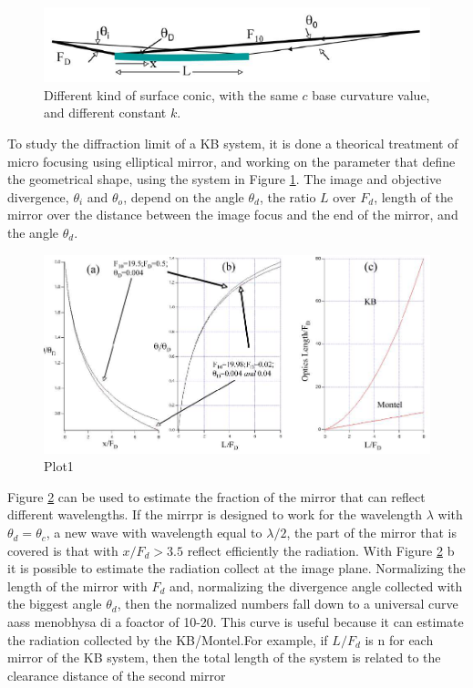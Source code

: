 \begin{figure}[H]
%
\centering
%
\includegraphics[width=.7\textwidth]{Immagini/Chapter2/System4}
%
\caption{Different kind of surface conic, with the same $c $ base curvature value, and different constant $k $.}
%
\label{fig: System4}
%
\end{figure}
%
To study the diffraction limit of a KB system, it is done a theorical treatment of micro focusing using elliptical mirror, and working on the parameter that define the geometrical shape, using the system in Figure \ref{fig: System4}. The image and objective divergence, $\theta_i $ and $\theta_o $, depend on the angle $\theta_d $, the ratio $L $ over $F_d $, length of the mirror over the distance between the image focus and the end of the mirror, and the angle $\theta_d $.
\begin{figure}[]
%
\centering
%
\includegraphics[width=1.\textwidth]{Immagini/Chapter2/Plot1}
%
\caption{Plot1}
%
\label{fig: Plot1}
%
\end{figure}
%
\noindent Figure \ref{fig: Plot1} can be used to estimate the fraction of the mirror that can reflect different wavelengths. If the mirrpr is designed to work for the wavelength $\lambda $ with $\theta_d = \theta_c $, a new wave with wavelength equal to $\lambda / 2 $, the part of the mirror that is covered is that with $x / F_d > 3.5$ reflect efficiently the radiation. With Figure \ref{fig: Plot1} b it is possible to estimate the radiation collect at the image plane. Normalizing the length of the mirror with $F_d $ and, normalizing the divergence angle collected with the biggest angle $\theta_d $, then the normalized numbers fall down to a universal curve aass menobhysa di a foactor of 10-20. This curve is useful because it can estimate the radiation collected by the KB/Montel.For example, if $L/F_d $ is n for each mirror of the KB system, then the total length of the system is related to the clearance distance of the second mirror
